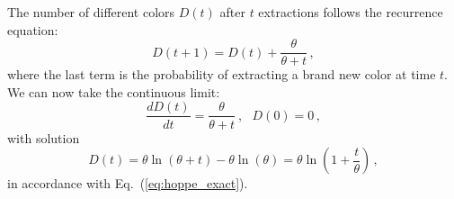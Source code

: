 \documentclass[graybox]{svmult}
\begin{document}
The number of different colors $D(t)$ after $t$ extractions follows the
recurrence equation:
\begin{equation}
D(t+1) = D(t)+ \frac{\theta}{\theta +t} \,,
\end{equation}
%
where the last term is the probability of extracting a brand
new color at time $t$. We can now take the continuous limit:
%
\begin{equation}
\frac{d D(t)}{  dt } = \frac{\theta}{\theta+t} ~,  ~~~ D(0)=0 \,,
\end{equation}
%
with solution 
\begin{equation}\label{eq:Dt_hoppe}
D(t) = \theta \ln {(\theta +t)} - \theta \ln {(\theta)}  = 
    \theta\ln (1+\frac{t}{\theta})\,,
\end{equation}
%
in accordance with Eq.~(\ref{eq:hoppe_exact}). 
\end{document}
